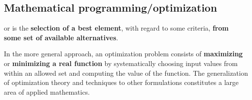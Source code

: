 \subsection{Mathematical programming/optimization}\label{subsection: Mathematical programming/optimization}

 or  is the \textbf{selection of a best element}, with regard to some criteria, \textbf{from some set of available alternatives}.

In the more general approach, an optimization problem consists of \textbf{maximizing} or \textbf{minimizing a real function} by systematically choosing input values from within an allowed set and computing the value of the function. The generalization of optimization theory and techniques to other formulations constitutes a large area of applied mathematics.

